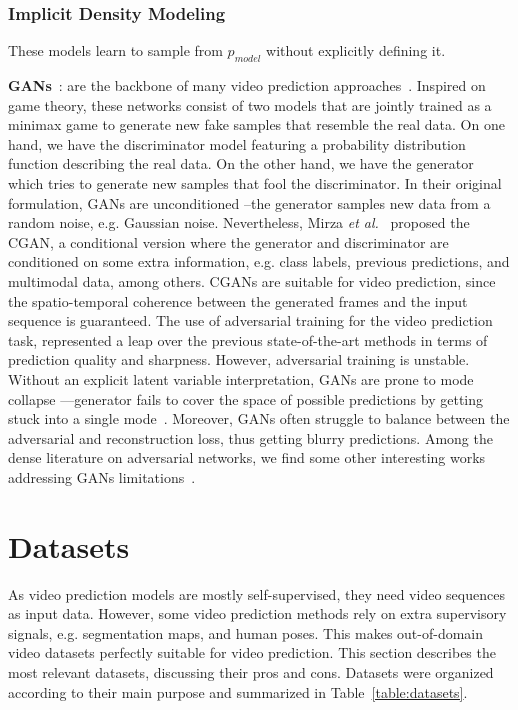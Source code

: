 \subsubsection{Implicit Density Modeling}
These models learn to sample from $p_{model}$ without explicitly defining it. 

\vspace*{0.1cm}\noindent\textbf{\acp{GAN}}~\cite{Goodfellow2014}: are the backbone of many video prediction approaches~\cite{Mathieu2016,Lotter2015,Liang2017,Hu2019,Chen2017,Wichers2018,Jin2017,Walker2017,Villegas2017,Kwon2019,Vondrick2017, Villegas2017a,Lu2017,Zhou2016,Bhattacharjee2017,Vondrick2016,Saito2017,Chen2017a,Tulyakov2018}. Inspired on game theory, these networks consist of two models that are jointly trained as a minimax game to generate new fake samples that resemble the real data. On one hand, we have the discriminator model featuring a probability distribution function describing the real data. On the other hand, we have the generator which tries to generate new samples that fool the discriminator. In their original formulation, \acp{GAN} are unconditioned --the generator samples new data from a random noise, e.g. Gaussian noise. Nevertheless, Mirza \textit{et al.}~\cite{Mirza2014} proposed the \ac{CGAN}, a conditional version where the generator and discriminator are conditioned on some extra information, e.g. class labels, previous predictions, and multimodal data, among others. \acp{CGAN} are suitable for video prediction, since the spatio-temporal coherence between the generated frames and the input sequence is guaranteed. The use of adversarial training for the video prediction task, represented a leap over the previous state-of-the-art methods in terms of prediction quality and sharpness. However, adversarial training is unstable. Without an explicit latent variable interpretation, \acp{GAN} are prone to mode collapse ---generator fails to cover the space of possible predictions by getting stuck into a single mode~\cite{Henaff2017,Lee2018}. Moreover, \acp{GAN} often struggle to balance between the adversarial and reconstruction loss, thus getting blurry predictions. Among the dense literature on adversarial networks, we find some other interesting works addressing \acp{GAN} limitations~\cite{Radford2016,Arjovsky2017}.

\section{Datasets}
\label{sec:datasets}
As video prediction models are mostly self-supervised, they need video sequences as input data. However, some video prediction methods rely on extra supervisory signals, e.g. segmentation maps, and human poses. This makes out-of-domain video datasets perfectly suitable for video prediction. This section describes the most relevant datasets, discussing their pros and cons. Datasets were organized according to their main purpose and summarized in Table~\ref{table:datasets}.

